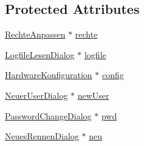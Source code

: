 \subsection*{Protected Attributes}
\begin{CompactItemize}
\item 
\hyperlink{class_rechte_anpassen}{RechteAnpassen} $\ast$ \hyperlink{class_b_e_o___timing_19f749ab5e005801517ec98286a89596}{rechte}
\item 
\hyperlink{class_logfile_lesen_dialog}{LogfileLesenDialog} $\ast$ \hyperlink{class_b_e_o___timing_b8cfb6b1d41a21e54498a183eef54651}{logfile}
\item 
\hyperlink{class_hardware_konfiguration}{HardwareKonfiguration} $\ast$ \hyperlink{class_b_e_o___timing_8abbf93b70915e725738223a587cb42d}{config}
\item 
\hyperlink{class_neuer_user_dialog}{NeuerUserDialog} $\ast$ \hyperlink{class_b_e_o___timing_dbc64dafa7003517063029cd10e2b583}{newUser}
\item 
\hyperlink{class_password_change_dialog}{PasswordChangeDialog} $\ast$ \hyperlink{class_b_e_o___timing_00ca0d5e67f1d99118b529b9a9cbed9f}{pwd}
\item 
\hyperlink{class_neues_rennen_dialog}{NeuesRennenDialog} $\ast$ \hyperlink{class_b_e_o___timing_4a79dc06af7ae3a6f89459062e2a7b85}{neu}
\end{CompactItemize}
